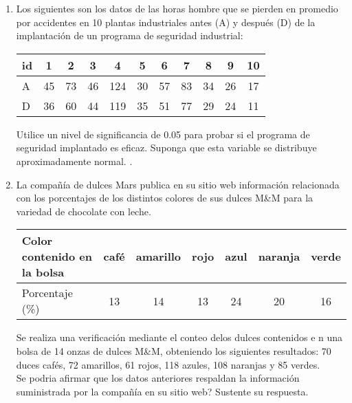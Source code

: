 \documentclass[base=hide,9pt]{elegantbook}
\begin{document}
\begin{enumerate}
	\item Los siguientes son los datos de las horas hombre que se pierden en promedio por accidentes en 10 plantas industriales antes (A) y después (D) de la implantación de un programa de seguridad industrial:\\
	
	\begin{tabular}{l|cccccccccc}
		id & 1 &  2 & 3  & 4  &  5  & 6  & 7  & 8  & 9  & 10\\ \hline 
		A  & 45 & 73 & 46 & 124 & 30 & 57 & 83 & 34 & 26 & 17 \\  \hline 
		D  & 36 & 60 & 44 & 119 & 35 & 51 & 77 & 29 & 24 & 11 \\   
	\end{tabular}
	
	\vspace{.5cm}
	Utilice un nivel de significancia de 0.05 para probar si el programa de seguridad implantado es eficaz. Suponga que esta variable se distribuye aproximadamente normal.
	\vspace{.5cm}
	.
	\vspace{1cm}
	\item La compañía de dulces Mars publica en su sitio web información relacionada con los porcentajes de los distintos colores de sus dulces M\&M para la variedad de chocolate con leche.\\
	
	\begin{tabular}{l|cccccc}
		Color contenido en la bolsa & café & amarillo & rojo & azul & naranja & verde \\
		\hline 
		Porcentaje (\%)             & 13 & 14 & 13 & 24 & 20 & 16 \\
	\end{tabular}
	Se realiza una verificación mediante el conteo delos dulces contenidos e n una bolsa de 14 onzas de dulces M\&M, obteniendo los siguientes resultados: 70 duces cafés, 72 amarillos, 61 rojos, 118 azules, 108 naranjas y 85 verdes. \\
	
	Se podria afirmar que los datos anteriores respaldan la información suministrada por la compañía en su sitio web? Sustente su respuesta.
	

\end{enumerate}
\end{document}
